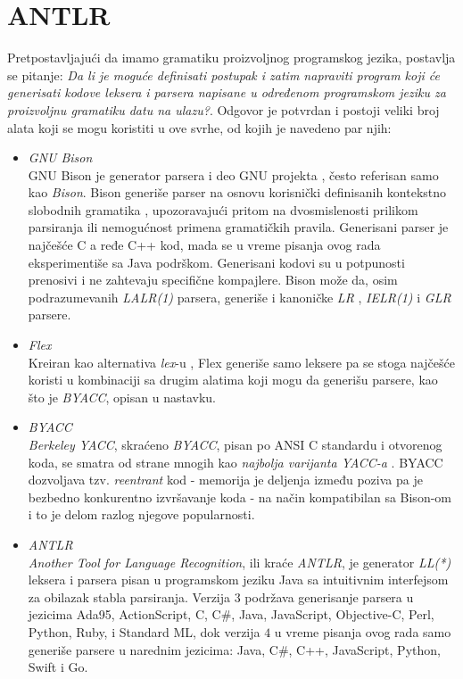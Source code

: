 \section{ANTLR}
\label{sec:ANTLR}

Pretpostavljajući da imamo gramatiku proizvoljnog programskog jezika, postavlja se pitanje: \emph{Da li je moguće definisati postupak i zatim napraviti program koji će generisati kodove leksera i parsera napisane u određenom programskom jeziku za proizvoljnu gramatiku datu na ulazu?}. Odgovor je potvrdan i postoji veliki broj alata koji se mogu koristiti u ove svrhe, od kojih je navedeno par njih: 
\begin{itemize}
    \item \emph{GNU Bison} \cite{GNUBison}\\
        GNU Bison je generator parsera i deo GNU projekta \cite{GNUProject}, često referisan samo kao \emph{Bison}. Bison generiše parser na osnovu korisnički definisanih kontekstno slobodnih gramatika \cite{ContextFreeGrammars}, upozoravajući pritom na dvosmislenosti prilikom parsiranja ili nemogućnost primena gramatičkih pravila. Generisani parser je najčešće C a ređe C++ kod, mada se u vreme pisanja ovog rada eksperimentiše sa Java podrškom. Generisani kodovi su u potpunosti prenosivi i ne zahtevaju specifične kompajlere. Bison može da, osim podrazumevanih \emph{LALR(1)} \cite{LALR1} parsera, generiše i kanoničke \emph{LR} \cite{LR}, \emph{IELR(1)} \cite{IELR1} i \emph{GLR} \cite{GLR} parsere.
    \item \emph{Flex} \cite{Flex}\\
        Kreiran kao alternativa \emph{lex}-u \cite{Lex}, Flex generiše samo leksere pa se stoga najčešće koristi u kombinaciji sa drugim alatima koji mogu da generišu parsere, kao što je \emph{BYACC}, opisan u nastavku.
    \item \emph{BYACC} \cite{BYACC}\\
        \emph{Berkeley YACC}, skraćeno \emph{BYACC}, pisan po ANSI C standardu i otvorenog koda, se smatra od strane mnogih kao \textit{najbolja varijanta YACC-a} \cite{YACC}. BYACC dozvoljava tzv. \emph{reentrant} kod - memorija je deljenja između poziva pa je bezbedno konkurentno izvršavanje koda - na način kompatibilan sa Bison-om i to je delom razlog njegove popularnosti.
    \item \emph{ANTLR} \cite{ANTLR}\\
        \emph{Another Tool for Language Recognition}, ili kraće \emph{ANTLR}, je generator \emph{LL(*)} \cite{LLStar} leksera i parsera pisan u programskom jeziku Java sa intuitivnim interfejsom za obilazak stabla parsiranja. Verzija $3$ podržava generisanje parsera u jezicima Ada95, ActionScript, C, C\#, Java, JavaScript, Objective-C, Perl, Python, Ruby, i Standard ML, dok verzija $4$ u vreme pisanja ovog rada samo generiše parsere u narednim jezicima: Java, C\#, C++, JavaScript, Python, Swift i Go.
\end{itemize}

